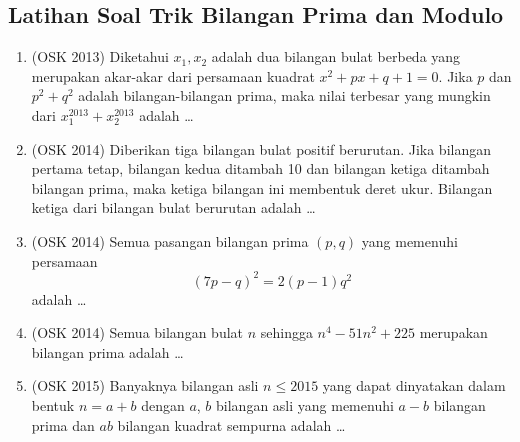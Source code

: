 \subsection{Latihan Soal Trik Bilangan Prima dan Modulo}
\begin{enumerate}
        \item (OSK 2013) Diketahui $x_1,x_2$ adalah dua bilangan bulat berbeda yang merupakan akar-akar dari persamaan kuadrat $x^2+px+q+1=0$. Jika $p$ dan $p^2+q^2$ adalah bilangan-bilangan prima, maka nilai terbesar yang mungkin dari $x_1^{2013}+x_2^{2013}$ adalah \dots
        
        \item (OSK 2014) Diberikan tiga bilangan bulat positif berurutan. Jika bilangan pertama tetap, bilangan kedua ditambah 10 dan bilangan ketiga ditambah bilangan prima, maka ketiga bilangan ini membentuk deret ukur. Bilangan ketiga dari bilangan bulat berurutan adalah \dots
        
        \item (OSK 2014) Semua pasangan bilangan prima $(p,q)$ yang memenuhi persamaan
        $$(7p-q)^2=2(p-1)q^2$$
        adalah \dots
        
        \item (OSK 2014) Semua bilangan bulat $n$ sehingga $n^4-51n^2+225$ merupakan bilangan prima adalah \dots

        \item (OSK 2015) Banyaknya bilangan asli $n \leq 2015$ yang dapat dinyatakan dalam bentuk $n = a + b$ dengan $a$, $b$ bilangan asli yang memenuhi $a - b$ bilangan prima dan $ab$ bilangan kuadrat sempurna adalah \ldots
\end{enumerate}